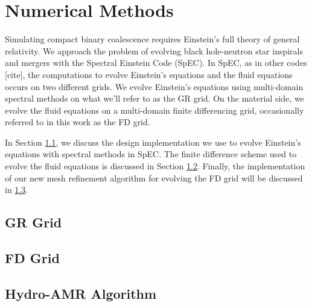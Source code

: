 \chapter{Numerical Methods}
\label{chap:chapter-3}

Simulating compact binary coalescence requires Einstein's full theory of general relativity.
We approach the problem of evolving black hole-neutron star inspirals and mergers with the Spectral Einstein Code (SpEC).  
In SpEC, as in other codes [cite], the computations to evolve Einstein's equations and the fluid equations occurs on two different grids.
We evolve Einstein's equations using multi-domain spectral methods on what we'll refer to as the GR grid.
On the material side, we evolve the fluid equations on a multi-domain finite differencing grid, occasionally referred to in this work as the FD grid.

In Section \ref{sec:gr-grid}, we discuss the design implementation we use to evolve Einstein's equations with spectral methods in SpEC.  The finite difference scheme used to evolve the fluid equations is discussed in Section \ref{sec:fd-grid}.  Finally, the implementation of our new mesh refinement algorithm for evolving the FD grid will be discussed in \ref{sec:hydro-amr}.

\section{GR Grid}
\label{sec:gr-grid}


\section{FD Grid}
\label{sec:fd-grid}




\section{Hydro-AMR Algorithm}
\label{sec:hydro-amr}

